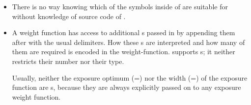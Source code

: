 \begin{itemize}
\begin{restrictedmaterial}{OS~X}
    \begin{enumerate}
    \item {},
    \item {},
    \item current working directory, and finally
    \item {}.
    \end{enumerate}

    For details of the search algorithm please consult the manual page of .
  \end{restrictedmaterial}

  \smallskip

  \begin{restrictedmaterial}{Windows}
    If  specifies an absolute filename, exactly this file is used.
    Otherwise \App{} searches in the following directories and in this order:

    \begin{enumerate}
    \item The directory from which \appcmd{} is loaded.
    \item The system directory.
    \item The Windows directory.
    \item The current directory.
    \item The directories that are listed in the ~environment variable.
    \end{enumerate}

    For details consult the manual page of LoadLibrary.
  \end{restrictedmaterial}

\item
  There is no way knowing which of the symbols inside of  are suitable
  for  without knowledge of source code of .

\item
  A weight function has access to additional s passed in by appending them
  after  with the usual delimiters.  How these s are
  interpreted and how many of them are required is encoded in the weight-function.  \App{}
  supports s; it neither restricts their number nor their type.

  \begin{geeknote}%
    Usually, neither the exposure optimum
    (=\feasiblebreak{}) nor the width
    (=\feasiblebreak{}) of the exposure function are
    s, because they are always explicitly passed on to any exposure weight
    function.
  \end{geeknote}


\end{itemize}
